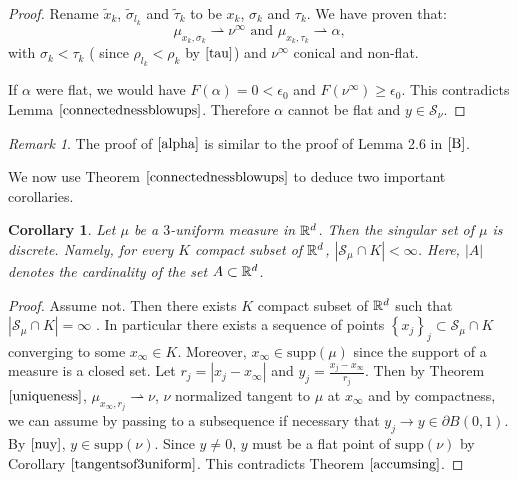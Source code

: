 \documentclass[11pt]{article}
\newtheorem{corollary}[theorem]{Corollary}
\theoremstyle{definition}
\theoremstyle{remark}
\newtheorem{remark}{Remark}[section]
\numberwithin{equation}{section}
\begin{document}
\begin{proof}
Rename $\tilde{x}_k$, $\tilde{\sigma}_{l_k}$ and $\tilde{\tau}_{k}$ to be $x_k$, $\sigma_k$ and $\tau_k$.
We have proven that: 
$$ \mu_{x_k, \sigma_{k}} \rightharpoonup \nu^{\infty} \mbox{ and } \mu_{x_k, \tau_k} \rightharpoonup \alpha, $$
with $\sigma_{k}< \tau_{k}$ ( since $\rho_{l_k} < \rho_{k}$ by $\eqref{tau}$) and $\nu^{\infty}$ conical and non-flat. 

If $\alpha$ were flat,
we would have $F(\alpha)=0<\epsilon_{0}$ and $F(\nu^{\infty}) \geq \epsilon_{0}$. This contradicts Lemma $\ref{connectednessblowups}$.
Therefore $\alpha$ cannot be flat and $y \in \mathcal{S}_{\nu}$.

\end{proof}
\begin{remark}
The proof of $\eqref{alpha}$ is similar to the proof of Lemma 2.6 in $\cite{B}$. 
\end{remark}

We now use Theorem $\ref{connectednessblowups}$ to deduce two important corollaries.



\begin{corollary}\label{isolate3unif}
Let $\mu$ be a $3$-uniform measure in $\mathbb{R}^{d}$. Then the singular set of $\mu$ is discrete. Namely, for every $K$ compact subset of $\mathbb{R}^{d}$, $\left| \mathcal{S}_{\mu} \cap K \right| < \infty$. Here, $|A|$ denotes the cardinality of the set $A \subset \mathbb{R}^{d}$.
\end{corollary}
\begin{proof}
Assume not. Then there exists $K$ compact subset of $\mathbb{R}^{d}$ such that $\left|\mathcal{S}_{\mu} \cap K\right| = \infty$ . In particular there exists a sequence of points $\left\lbrace x_j \right\rbrace _{j} \subset \mathcal{S}_{\mu} \cap K$ converging to some  $x_{\infty} \in K$. Moreover, $x_{\infty} \in \mbox{supp}(\mu)$ since the support of a measure is a closed set.
Let $r_j = |x_j-x_{\infty}|$ and $y_j = \frac{x_{j}-x_{\infty}}{r_j}$. Then by Theorem $\ref{uniqueness}$, $\mu_{x_{\infty} , r_j } \rightharpoonup \nu$, $\nu$ normalized tangent to $\mu$ at $x_{\infty}$ and by compactness, we can assume by passing to a subsequence if necessary that $y_j \to y \in \partial B(0,1)$. 
By $\eqref{nuy}$, $y \in \mbox{supp}(\nu)$. Since $y \neq 0$, $y$ must be a flat point of $\mbox{supp}(\nu)$ by Corollary $\ref{tangentsof3uniform}$. This contradicts Theorem $\ref{accumsing}$.

\end{proof}
\end{document}
